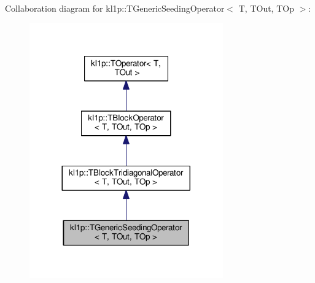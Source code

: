 Collaboration diagram for kl1p\+:\+:T\+Generic\+Seeding\+Operator$<$ T, T\+Out, T\+Op $>$\+:
\nopagebreak
\begin{figure}[H]
\begin{center}
\leavevmode
\includegraphics[width=236pt]{classkl1p_1_1TGenericSeedingOperator__coll__graph}
\end{center}
\end{figure}
